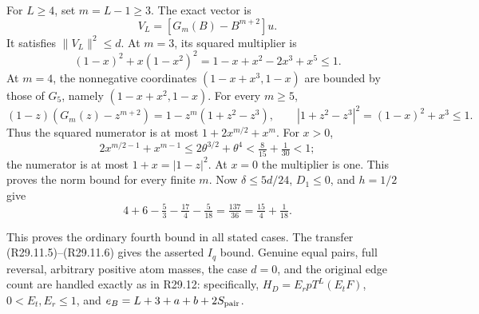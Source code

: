 For \(L\ge4\), set \(m=L-1\ge3\). The exact vector is
\begin{equation}\tag{R31.10.9}\label{eq:oc:R31:10.9}
 V_L=[G_m(B)-B^{m+2}]u.
\end{equation}
It satisfies \(\|V_L\|^2\le d\). At \(m=3\), its squared multiplier is
\[
 (1-x)^2+x(1-x^2)^2=1-x+x^2-2x^3+x^5\le1.
\]
At \(m=4\), the nonnegative coordinates \((1-x+x^3,1-x)\)
are bounded by those of \(G_5\), namely \((1-x+x^2,1-x)\).
For every \(m\ge5\),
\[
 (1-z)(G_m(z)-z^{m+2})=1-z^m(1+z^2-z^3),\qquad
 |1+z^2-z^3|^2=(1-x)^2+x^3\le1.
\]
Thus the squared numerator is at most \(1+2x^{m/2}+x^m\).
For \(x>0\),
\[
 2x^{m/2-1}+x^{m-1}\le2\theta^{3/2}+\theta^4
 <\tfrac8{15}+\tfrac1{30}<1;
\]
the numerator is at most \(1+x=|1-z|^2\). At \(x=0\) the
multiplier is one. This proves the norm bound for every finite \(m\).
Now \(\delta\le5d/24\), \(D_1\le0\), and \(h=1/2\) give
\begin{equation}\tag{R31.10.10}\label{eq:oc:R31:10.10}
 4+6-\tfrac53-\tfrac{17}{4}-\tfrac5{18}
 =\tfrac{137}{36}=\tfrac{15}{4}+\tfrac1{18}.
\end{equation}

This proves the ordinary fourth bound in all stated cases. The
transfer (R29.11.5)--(R29.11.6) gives the asserted \(I_q\) bound.
Genuine equal pairs, full reversal, arbitrary positive atom masses,
the case \(d=0\), and the original edge count are handled exactly
as in R29.12: specifically, \(H_D=E_rpT^L(E_tF)\),
\(0<E_t,E_r\le1\), and \(e_B=L+3+a+b+2S_{\rm pair}\).
